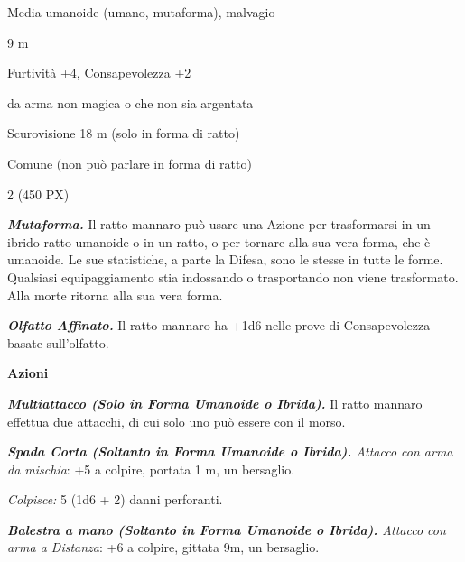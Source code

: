 \begin{multicols}{2}
{
\begin{description}[noitemsep, topsep=0pt, parsep=0pt, partopsep=0pt, itemsep=1pt, leftmargin=2.35cm,  labelwidth=2.2cm, itemindent=0cm, listparindent=0pt] %
\setlength{\baselineskip}{10pt}
\item[\textbf{Taglia/Tipo}] Media umanoide (umano, mutaforma), malvagio
\item[\textbf{Caratt.}] 
\item[\textbf{Punti Ferita}] 
\item[\textbf{Movimento}] 9 m
\item[\textbf{Tiri Salvez.}] 
\item[\textbf{Comp.}] Furtività +4, Consapevolezza +2
\item[\textbf{Imm. Danni}] da arma non magica o che non sia argentata
\item[\textbf{Sensi}] Scurovisione 18 m (solo in forma di ratto)
\item[\textbf{Linguaggi}] Comune (non può parlare in forma di ratto)
\item[\textbf{Sfida}] 2 (450 PX)
\end{description}
\smallskip

\emph{\textbf{Mutaforma.}} Il ratto mannaro può usare una Azione per trasformarsi in un ibrido ratto-umanoide o in un ratto, o per tornare alla sua vera forma, che è umanoide. Le sue statistiche, a parte la Difesa, sono le stesse in tutte le forme. Qualsiasi equipaggiamento stia indossando o trasportando non viene trasformato. Alla morte ritorna alla sua vera forma.

\emph{\textbf{Olfatto Affinato.}} Il ratto mannaro ha +1d6 nelle prove di Consapevolezza basate sull'olfatto.

\textbf{Azioni}

\emph{\textbf{Multiattacco (Solo in Forma Umanoide o Ibrida).}} Il ratto mannaro effettua due attacchi, di cui solo uno può essere con il morso.

\emph{\textbf{Spada Corta (Soltanto in Forma Umanoide o Ibrida).} Attacco con arma da mischia}: +5 a colpire, portata 1 m, un bersaglio.

\emph{Colpisce:} 5 (1d6 + 2) danni perforanti.

\emph{\textbf{Balestra a mano (Soltanto in Forma Umanoide o Ibrida).} Attacco con arma a Distanza}: +6 a colpire, gittata 9m, un bersaglio.

}
\end{multicols}
